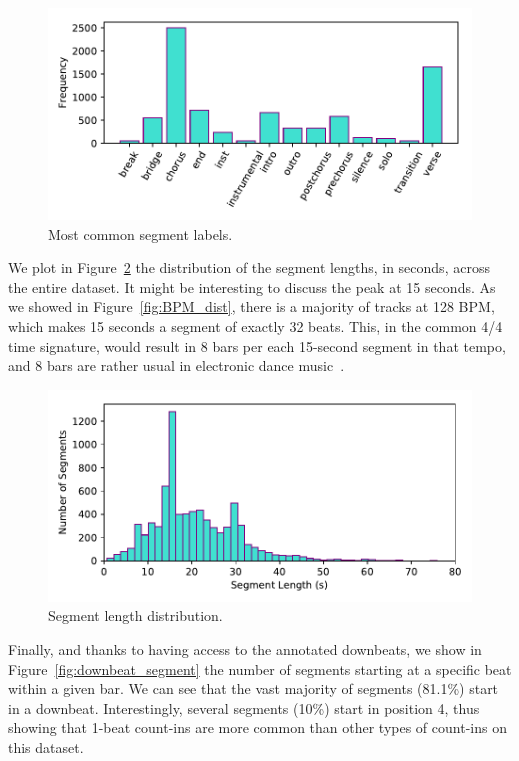 \documentclass{article}
\begin{document}
\begin{figure}
    \centerline{\includegraphics[width=\columnwidth]{figs/SegmentLabels_distribution.pdf}}
    \caption{Most common segment labels.}
    \label{fig:seglabel_dist}
\end{figure}

We plot in Figure~\ref{fig:seglen_dist} the distribution of the segment lengths, in seconds, across the entire dataset.
It might be interesting to discuss the peak at 15 seconds.
As we showed in Figure~\ref{fig:BPM_dist}, there is a majority of tracks at 128 BPM, which makes 15 seconds a segment of exactly 32 beats.
This, in the common 4/4 time signature, would result in 8 bars per each 15-second segment in that tempo, and 8 bars are rather usual in electronic dance music~\cite{Moelants2008}.

\begin{figure}
    \centerline{\includegraphics[width=\columnwidth]{figs/SegmentLength_distribution.pdf}}
    \caption{Segment length distribution.}
    \label{fig:seglen_dist}
\end{figure}

Finally, and thanks to having access to the annotated downbeats, we show in Figure~\ref{fig:downbeat_segment} the number of segments starting at a specific beat within a given bar.
We can see that the vast majority of segments (81.1\%) start in a downbeat.
Interestingly, several segments (10\%) start in position 4, thus showing that 1-beat count-ins are more common than other types of count-ins on this dataset.
\end{document}
